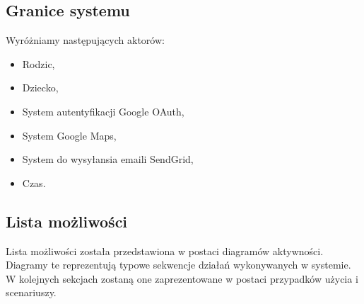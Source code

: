 \documentclass{sprawozdanie-agh}
\begin{document}
		\subsection{Granice systemu}

			Wyróżniamy następujących aktorów:
			\begin{itemize}
				\item Rodzic,
				\item Dziecko,
				\item System autentyfikacji Google OAuth,
				\item System Google Maps,
				\item System do wysyłansia emaili SendGrid,
				\item Czas.
			\end{itemize}

		\subsection{Lista możliwości}

			Lista możliwości została przedstawiona w postaci diagramów aktywności. Diagramy te reprezentują typowe sekwencje działań wykonywanych w systemie. W kolejnych sekcjach zostaną one zaprezentowane w postaci przypadków użycia i scenariuszy.
\end{document}
